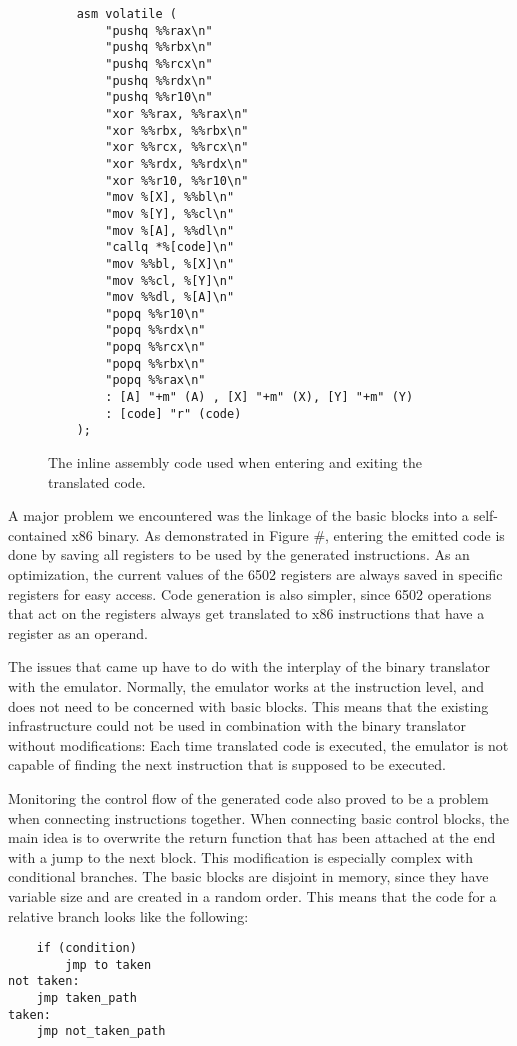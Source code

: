 \begin{figure}[!h]
\begin{lstlisting}
    asm volatile (
        "pushq %%rax\n"
        "pushq %%rbx\n"
        "pushq %%rcx\n"
        "pushq %%rdx\n"
        "pushq %%r10\n"
        "xor %%rax, %%rax\n"
        "xor %%rbx, %%rbx\n"
        "xor %%rcx, %%rcx\n"
        "xor %%rdx, %%rdx\n"
        "xor %%r10, %%r10\n"
        "mov %[X], %%bl\n"
        "mov %[Y], %%cl\n"
        "mov %[A], %%dl\n"
        "callq *%[code]\n"
        "mov %%bl, %[X]\n"
        "mov %%cl, %[Y]\n"
        "mov %%dl, %[A]\n"
        "popq %%r10\n"
        "popq %%rdx\n"
        "popq %%rcx\n"
        "popq %%rbx\n"
        "popq %%rax\n"
        : [A] "+m" (A) , [X] "+m" (X), [Y] "+m" (Y) 
        : [code] "r" (code)
    );
\end{lstlisting}
	\caption {The inline assembly code used when entering and exiting the translated code.}
\end{figure}
 
A major problem we encountered was the linkage of the basic blocks into a self-contained x86 binary. 
As demonstrated in Figure \#, entering the emitted code is done by saving all registers to be used by the generated instructions.
As an optimization, the current values of the 6502 registers are always saved in specific registers for easy access.
Code generation is also simpler, since 6502 operations that act on the registers always get translated to x86 instructions that have a register as an operand.

The issues that came up have to do with the interplay of the binary translator with the emulator.
Normally, the emulator works at the instruction level, and does not need to be concerned with basic blocks.
This means that the existing infrastructure could not be used in combination with the binary translator without modifications:
Each time translated code is executed, the emulator is not capable of finding the next instruction that is supposed to be executed.

Monitoring the control flow of the generated code also proved to be a problem when connecting instructions together.
When connecting basic control blocks, the main idea is to overwrite the return function that has been attached at the end with a jump to the next block. 
This modification is especially complex with conditional branches. 
The basic blocks are disjoint in memory, since they have variable size and are created in a random order.
This means that the code for a relative branch looks like the following:

\begin{lstlisting}
	if (condition)
		jmp to taken
not taken:	
	jmp taken_path
taken:		
	jmp not_taken_path
\end{lstlisting}

